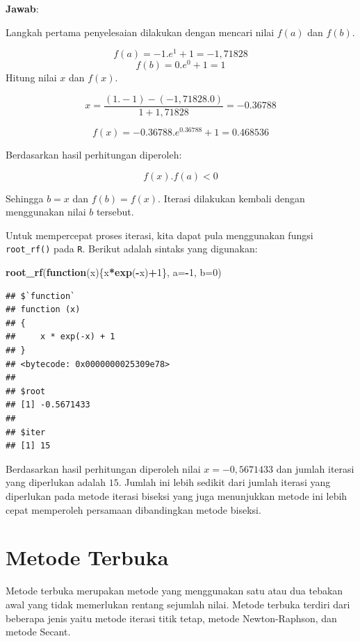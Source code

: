 \documentclass[]{book}
\newenvironment{Shaded}{\begin{snugshade}}{\end{snugshade}}
\newcommand{\ControlFlowTok}[1]{\textcolor[rgb]{0.13,0.29,0.53}{\textbf{#1}}}
\newcommand{\DataTypeTok}[1]{\textcolor[rgb]{0.13,0.29,0.53}{#1}}
\newcommand{\DecValTok}[1]{\textcolor[rgb]{0.00,0.00,0.81}{#1}}
\newcommand{\KeywordTok}[1]{\textcolor[rgb]{0.13,0.29,0.53}{\textbf{#1}}}
\newcommand{\NormalTok}[1]{#1}
\newcommand{\OperatorTok}[1]{\textcolor[rgb]{0.81,0.36,0.00}{\textbf{#1}}}
\theoremstyle{definition}
\theoremstyle{definition}
\theoremstyle{definition}
\theoremstyle{remark}
\begin{document}
\textbf{Jawab}:

Langkah pertama penyelesaian dilakukan dengan mencari nilai \(f\left(a \right)\) dan \(f\left(b \right)\).

\[
f\left(a \right)=-1.e^{1}+1=-1,71828
\]
\[
f\left(b \right)=0.e^{0}+1=1
\]
Hitung nilai \(x\) dan \(f\left(x \right)\).

\[
x=\frac{\left(1.-1\right)-\left(-1,71828.0\right)}{1+1,71828}=-0.36788
\]

\[
f\left(x \right)=-0.36788.e^{0.36788}+1=0.468536
\]

Berdasarkan hasil perhitungan diperoleh:

\[
f\left(x \right).f\left(a \right)<0
\]

Sehingga \(b=x\) dan \(f\left(b \right)=f\left(x \right)\). Iterasi dilakukan kembali dengan menggunakan nilai \(b\) tersebut.

Untuk mempercepat proses iterasi, kita dapat pula menggunakan fungsi \texttt{root\_rf()} pada \texttt{R}. Berikut adalah sintaks yang digunakan:

\begin{Shaded}
\begin{Highlighting}[]
\KeywordTok{root_rf}\NormalTok{(}\ControlFlowTok{function}\NormalTok{(x)\{x}\OperatorTok{*}\KeywordTok{exp}\NormalTok{(}\OperatorTok{-}\NormalTok{x)}\OperatorTok{+}\DecValTok{1}\NormalTok{\},}
               \DataTypeTok{a=}\OperatorTok{-}\DecValTok{1}\NormalTok{, }\DataTypeTok{b=}\DecValTok{0}\NormalTok{)}
\end{Highlighting}
\end{Shaded}

\begin{verbatim}
## $`function`
## function (x) 
## {
##     x * exp(-x) + 1
## }
## <bytecode: 0x0000000025309e78>
## 
## $root
## [1] -0.5671433
## 
## $iter
## [1] 15
\end{verbatim}

Berdasarkan hasil perhitungan diperoleh nilai \(x=-0,5671433\) dan jumlah iterasi yang diperlukan adalah \(15\). Jumlah ini lebih sedikit dari jumlah iterasi yang diperlukan pada metode iterasi biseksi yang juga menunjukkan metode ini lebih cepat memperoleh persamaan dibandingkan metode biseksi.

\hypertarget{openmethod}{%
\section{Metode Terbuka}\label{openmethod}}

Metode terbuka merupakan metode yang menggunakan satu atau dua tebakan awal yang tidak memerlukan rentang sejumlah nilai. Metode terbuka terdiri dari beberapa jenis yaitu metode iterasi titik tetap, metode Newton-Raphson, dan metode Secant.
\end{document}
